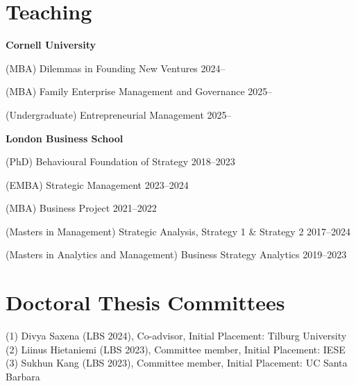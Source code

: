 \documentclass[11pt]{article}
\newcommand{\org}[1]{\vspace{2pt}\textbf{#1}\par}
\begin{document}
\section{Teaching}
\org{Cornell University}
\hspace*{1.2em}(MBA) Dilemmas in Founding New Ventures \hfill {\color{softgray}2024--}\par
\hspace*{1.2em}(MBA) Family Enterprise Management and Governance \hfill {\color{softgray}2025--}\par
\hspace*{1.2em}(Undergraduate) Entrepreneurial Management \hfill {\color{softgray}2025--}\par
\org{London Business School}
\hspace*{1.2em}(PhD) Behavioural Foundation of Strategy \hfill {\color{softgray}2018--2023}\par
\hspace*{1.2em}(EMBA) Strategic Management \hfill {\color{softgray}2023--2024}\par
\hspace*{1.2em}(MBA) Business Project \hfill {\color{softgray}2021--2022}\par
\hspace*{1.2em}(Masters in Management) Strategic Analysis, Strategy 1 \& Strategy 2 \hfill {\color{softgray}2017--2024}\par
\hspace*{1.2em}(Masters in Analytics and Management) Business Strategy Analytics \hfill {\color{softgray}2019--2023}\par
\section{Doctoral Thesis Committees}
\vspace{3pt}
(1) Divya Saxena (LBS 2024), Co-advisor, Initial Placement: Tilburg University\\
(2) Liinus Hietaniemi (LBS 2023), Committee member, Initial Placement: IESE\\
(3) Sukhun Kang (LBS 2023), Committee member, Initial Placement: UC Santa Barbara
\end{document}
